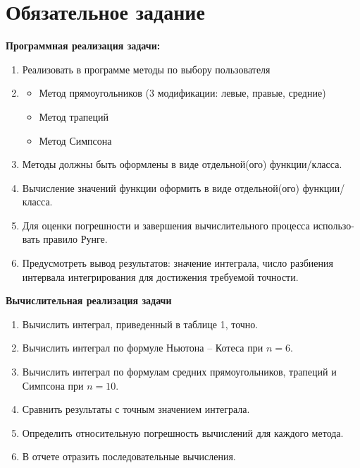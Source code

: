 \documentclass{article}
\begin{document}
\itmo[
      variant=13,
      labn=3,
      discipline=Вычислительная математика,
      group=P3212,
      student=Соколов Анатолий Владимирович,
      teacher=Наумова Надежда Александровна 
]
\lstset{language=rust}
\tableofcontents

\section{Обязательное задание}
\textbf{Программная реализация задачи:}
	\begin{enumerate}
		\item Реализовать в программе методы по выбору пользователя
		\item \begin{itemize}
			\item Метод прямоугольников (3 модификации: левые, правые, средние)
			\item Метод трапеций
			\item Метод Симпсона
		\end{itemize}
		\item Методы должны быть оформлены в виде отдельной(ого) функции/класса.
		\item Вычисление значений функции оформить в виде отдельной(ого) функции/класса.
		\item Для оценки погрешности и завершения вычислительного процесса использо-
		вать правило Рунге.
		\item Предусмотреть вывод результатов: значение интеграла, число разбиения интервала интегрирования для достижения требуемой точности.
	\end{enumerate}
\textbf{Вычислительная реализация задачи}
\begin{enumerate}
	\item Вычислить интеграл, приведенный в таблице 1, точно.
	\item Вычислить интеграл по формуле Ньютона – Котеса при $n = 6$.
	\item Вычислить интеграл по формулам средних прямоугольников, трапеций и Симпсона при $n = 10$.
	\item Сравнить результаты с точным значением интеграла.
	\item Определить относительную погрешность вычислений для каждого метода.
	\item В отчете отразить последовательные вычисления.
\end{enumerate}
\end{document}
